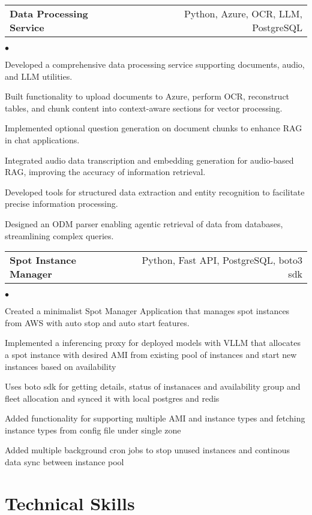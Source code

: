 \documentclass[margin, 11pt]{res}
\makeatletter
\newcommand{\resumeSubSubheading}[2]{
\begin{tabular*}{1.01\textwidth}{@{\hspace{-4pt}}l @{\extracolsep{\fill}} r}
    #1 & #2 
\end{tabular*}\vspace{-7pt}
}
\newenvironment{list2}{
	\begin{list}{$\bullet$}{%
	    \small
		\setlength{\itemsep}{0in}
		\setlength{\parsep}{0in} \setlength{\parskip}{0in}
		\setlength{\topsep}{0in} \setlength{\partopsep}{0in}
		\setlength{\leftmargin}{0.2in}}}{\end{list}}
\makeatother
\begin{document}
\begin{resume}
\resumeSubSubheading{\textbf{Data Processing Service}}
{Python, Azure, OCR, LLM, PostgreSQL}

\begin{list2}
    \item Developed a comprehensive data processing service supporting documents, audio, and LLM utilities.
    \item Built functionality to upload documents to Azure, perform OCR, reconstruct tables, and chunk content into context-aware sections for vector processing.
    \item Implemented optional question generation on document chunks to enhance RAG in chat applications.
    \item Integrated audio data transcription and embedding generation for audio-based RAG, improving the accuracy of information retrieval.
    \item Developed tools for structured data extraction and entity recognition to facilitate precise information processing.
    \item Designed an ODM parser enabling agentic retrieval of data from databases, streamlining complex queries.
\end{list2}

\resumeSubSubheading{\textbf{Spot Instance Manager}}
{Python, Fast API, PostgreSQL, boto3 sdk}

\begin{list2}
    \item Created a minimalist Spot Manager Application that manages spot instances from AWS with auto stop and auto start features.
    \item Implemented a inferencing proxy for deployed models with VLLM that allocates a spot instance with desired AMI from existing pool of instances and start new instances based on availability
    \item Uses boto sdk for getting details, status of instanaces and availability group and fleet allocation and synced it with local postgres and redis
    \item Added functionality for supporting multiple AMI and instance types and fetching instance types from config file under single zone
    \item Added multiple background cron jobs to stop unused instances and continous data sync between instance pool
\end{list2}


\section{\sc Technical Skills}


\end{resume}
\end{document}
